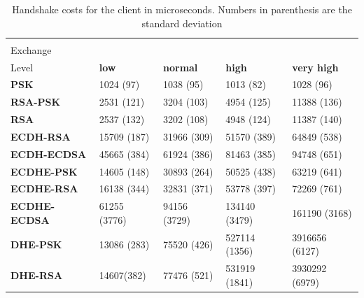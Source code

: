 			  \begin{table}[]
				\begin{tabular}{|l|l|l|l|l|}
				\hline
				 \backslashbox{Key\\Exchange}{Security\\Level}                    & \textbf{low} & \textbf{normal} & \textbf{high} & \textbf{very high} \\ \hline
				\textbf{PSK}         & 1024 (97)    & 1038 (95)        & 1013 (82)      & 1028 (96)           \\ \hline
				\textbf{RSA-PSK}     & 2531 (121)    & 3204 (103)       & 4954 (125)     & 11388 (136)         \\ \hline
				\textbf{RSA}         & 2537 (132)    & 3202 (108)       & 4948 (124)     & 11387 (140)         \\ \hline
				\textbf{ECDH-RSA}    & 15709 (187)  & 31966 (309)      & 51570 (389)    & 64849 (538)         \\ \hline
				\textbf{ECDH-ECDSA}  & 45665 (384)   & 61924 (386)      & 81463 (385)    & 94748 (651)         \\ \hline
				\textbf{ECDHE-PSK}   & 14605 (148)  & 30893 (264)      & 50525 (438)    & 63219 (641)         \\ \hline
				\textbf{ECDHE-RSA}   & 16138 (344)  & 32831 (371)      & 53778 (397)    & 72269 (761)         \\ \hline
				\textbf{ECDHE-ECDSA} & 61255 (3776)  & 94156 (3729)     & 134140 (3479)  & 161190 (3168)       \\ \hline
				\textbf{DHE-PSK}     & 13086 (283)  & 75520 (426)      & 527114 (1356)  & 3916656 (6127)      \\ \hline
				\textbf{DHE-RSA}     & 14607(382)   & 77476 (521)      & 531919 (1841)  & 3930292 (6979)      \\ \hline
				\end{tabular}
				\caption{Handshake costs for the client in microseconds. Numbers in parenthesis are the standard deviation}
				\label{table:hs-costs-cli-papi}
				\end{table}
  
